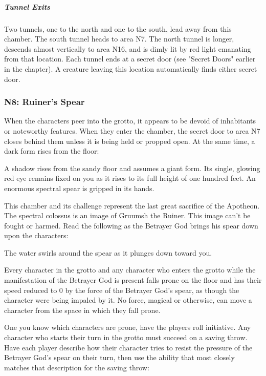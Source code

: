 \documentclass[10pt,a4paper,twoside,fancy,bg=print,twocolumn,openany,nodeprecatedcode]{dndbook}
\begin{document}
\subparagraph{Tunnel Exits}
Two tunnels, one to the north and one to the south, lead away from this chamber. The south tunnel heads to area N7. The north tunnel is longer, descends almost vertically to area N16, and is dimly lit by red light emanating from that location. Each tunnel ends at a secret door (see "Secret Doors" earlier in the chapter). A creature leaving this location automatically finds either secret door.

\subsubsection{N8: Ruiner's Spear}
When the characters peer into the grotto, it appears to be devoid of inhabitants or noteworthy features. When they enter the chamber, the secret door to area N7 closes behind them unless it is being held or propped open. At the same time, a dark form rises from the floor:

\begin{DndReadAloud}{}
A shadow rises from the sandy floor and assumes a giant form. Its single, glowing red eye remains fixed on you as it rises to its full height of one hundred feet. An enormous spectral spear is gripped in its hands.

\end{DndReadAloud}

This chamber and its challenge represent the last great sacrifice of the Apotheon. The spectral colossus is an image of Gruumsh the Ruiner. This image can't be fought or harmed. Read the following as the Betrayer God brings his spear down upon the characters:

\begin{DndReadAloud}{}
The water swirls around the spear as it plunges down toward you.

\end{DndReadAloud}

Every character in the grotto and any character who enters the grotto while the manifestation of the Betrayer God is present falls prone on the floor and has their speed reduced to 0 by the force of the Betrayer God's spear, as though the character were being impaled by it. No force, magical or otherwise, can move a character from the space in which they fall prone.

One you know which characters are prone, have the players roll initiative. Any character who starts their turn in the grotto must succeed on a saving throw. Have each player describe how their character tries to resist the pressure of the Betrayer God's spear on their turn, then use the ability that most closely matches that description for the saving throw:
\end{document}

